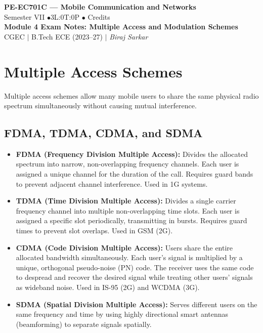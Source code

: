 \documentclass[12pt,a4paper]{article}
\begin{document}

\begin{center}
  {\LARGE\bfseries\color{myred} PE-EC701C --- Mobile Communication and Networks}\\[5pt]
  {\normalsize\color{mydark} Semester VII \quad$\bullet$\quad 3L:0T:0P \quad$\bullet$ Credits}\\[3pt]
  {\normalsize\color{myteal}\textbf{Module 4 Exam Notes: Multiple Access and Modulation Schemes}}\\[3pt]
  {\small\color{mydark} CGEC \;$|$\; B.Tech ECE (2023--27) \;$|$\; \textit{Biraj Sarkar}}
\end{center}
\noindent{\color{myred}\rule{\linewidth}{1.5pt}}
\vspace{2pt}

\hypersetup{linkcolor=mydark}
\tableofcontents
\hypersetup{linkcolor=myteal}
\newpage

\section{Multiple Access Schemes}

Multiple access schemes allow many mobile users to share the same physical radio spectrum simultaneously without causing mutual interference.

\subsection{FDMA, TDMA, CDMA, and SDMA}
\begin{itemize}[leftmargin=*, itemsep=3.5pt]
  \item \textbf{FDMA (Frequency Division Multiple Access):} Divides the allocated spectrum into narrow, non-overlapping frequency channels. Each user is assigned a unique channel for the duration of the call. Requires guard bands to prevent adjacent channel interference. Used in 1G systems.
  \item \textbf{TDMA (Time Division Multiple Access):} Divides a single carrier frequency channel into multiple non-overlapping time slots. Each user is assigned a specific slot periodically, transmitting in bursts. Requires guard times to prevent slot overlaps. Used in GSM (2G).
  \item \textbf{CDMA (Code Division Multiple Access):} Users share the entire allocated bandwidth simultaneously. Each user's signal is multiplied by a unique, orthogonal pseudo-noise (PN) code. The receiver uses the same code to despread and recover the desired signal while treating other users' signals as wideband noise. Used in IS-95 (2G) and WCDMA (3G).
  \item \textbf{SDMA (Spatial Division Multiple Access):} Serves different users on the same frequency and time by using highly directional smart antennas (beamforming) to separate signals spatially.
\end{itemize}
\end{document}
